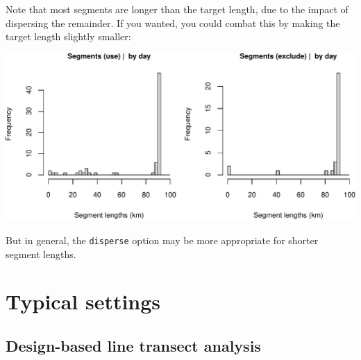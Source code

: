 \documentclass[
]{book}
\newenvironment{Shaded}{\begin{snugshade}}{\end{snugshade}}
\newcommand{\CommentTok}[1]{\textcolor[rgb]{0.56,0.35,0.01}{\textit{#1}}}
\newcommand{\DataTypeTok}[1]{\textcolor[rgb]{0.13,0.29,0.53}{#1}}
\newcommand{\DecValTok}[1]{\textcolor[rgb]{0.00,0.00,0.81}{#1}}
\newcommand{\KeywordTok}[1]{\textcolor[rgb]{0.13,0.29,0.53}{\textbf{#1}}}
\newcommand{\NormalTok}[1]{#1}
\newcommand{\OperatorTok}[1]{\textcolor[rgb]{0.81,0.36,0.00}{\textbf{#1}}}
\newcommand{\OtherTok}[1]{\textcolor[rgb]{0.56,0.35,0.01}{#1}}
\newcommand{\StringTok}[1]{\textcolor[rgb]{0.31,0.60,0.02}{#1}}
\begin{document}
Note that most segments are longer than the target length, due to the impact of dispersing the remainder. If you wanted, you could combat this by making the target length slightly smaller:

\begin{Shaded}
\end{Shaded}

\includegraphics{figures/unnamed-chunk-369-1.pdf}

But in general, the \texttt{disperse} option may be more appropriate for shorter segment lengths.

\hypertarget{typical-settings}{%
\section*{Typical settings}\label{typical-settings}}

\hypertarget{design-based-line-transect-analysis}{%
\subsection*{Design-based line transect analysis}\label{design-based-line-transect-analysis}}
\end{document}

